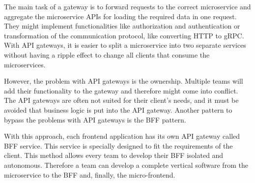 \bigskip

\noindent The main task of a gateway is to forward requests to the correct microservice and aggregate the microservice \acp{API} for loading the required data in one request. They might implement functionalities like authorization and authentication or transformation of the communication protocol, like converting \ac{HTTP} to \ac{gRPC}. With \ac{API} gateways, it is easier to split a microservice into two separate services without having a ripple effect to change all clients that consume the microservices. \cite[260-263]{book:2018:richardson:background:bff:microservices-patterns}

\bigskip

\noindent However, the problem with \ac{API} gateways is the ownership. Multiple teams will add their functionality to the gateway and therefore might come into conflict. The \ac{API} gateways are often not suited for their client's needs, and it must be avoided that business logic is put into the \ac{API} gateway. Another pattern to bypass the problems with \ac{API} gateways is the \ac{BFF} pattern. \cite[265-266]{book:2018:richardson:background:bff:microservices-patterns}

\bigskip

\noindent With this approach, each frontend application has its own \ac{API} gateway called \ac{BFF} service. This service is specially designed to fit the requirements of the client. \cite[264-266]{book:2018:richardson:background:bff:microservices-patterns} \cite[71-72]{book:2021:newman:background:bff:micro-services} This method allows every team to develop their \ac{BFF} isolated and autonomous. Therefore a team can develop a complete vertical software from the microservice to the \ac{BFF} and, finally, the micro-frontend. \cite{book:2020:geers:background:micro-frontends:micro-frontends-in-action}
